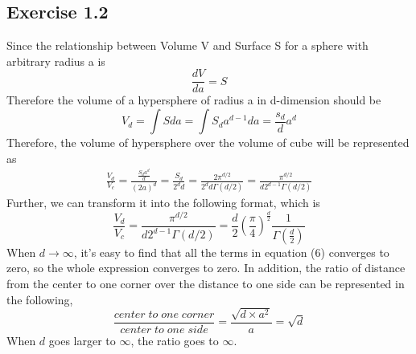 \documentclass{article} %
\begin{document}
\subsection{Exercise 1.2}
Since the relationship between Volume V and Surface S for a sphere with arbitrary radius a is $$\frac{dV}{da}=S$$
Therefore the volume of a hypersphere of radius a in d-dimension should be
\begin{equation}
V_d = \int Sda = \int S_da^{d-1}da = \frac{s_d}{d}a^d
\end{equation}
Therefore, the volume of hypersphere over the volume of cube will be represented as
\begin{equation}
\begin{split}
\frac{V_d}{V_c} = \frac{\frac{S_da^{d}}{d}}{(2a)^d}=\frac{S_d}{2^dd}=\frac{2\pi^{d/2}}{2^d d\Gamma(d/2)} = \frac{\pi^{d/2}}{d2^{d-1}\Gamma(d/2)}
\end{split}
\end{equation}
Further, we can transform it into the following format, which is
\begin{equation}
\frac{V_d}{V_c} = \frac{\pi^{d/2}}{d2^{d-1}\Gamma(d/2)} = \frac{d}{2}(\frac{\pi}{4})^\frac{d}{2}\frac{1}{\Gamma(\frac{d}{2})}
\end{equation}
When $d\rightarrow \infty$, it's easy to find that all the terms in equation (6) converges to zero, so the whole expression converges to zero.
In addition, the ratio of distance from the center to one corner over the distance to one side can be represented in the following,
\begin{equation}
\frac{center\;to\;one\;corner}{center\;to\;one\;side} = \frac{\sqrt{d\times a^2}}{a} = \sqrt{d}
\end{equation}
When $d$ goes larger to $\infty$, the ratio goes to $\infty$.
\end{document}
